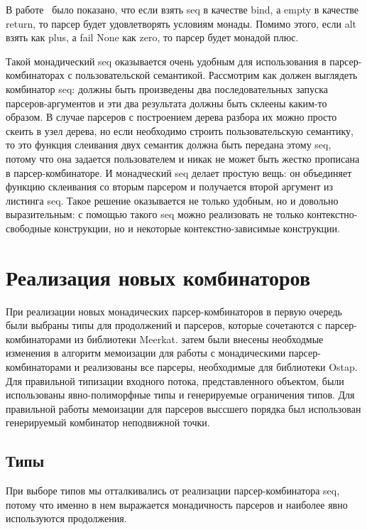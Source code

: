 \documentclass[conference]{IEEEtran}
\begin{document}
В работе~\cite{wadler} было показано, что если взять seq в качестве bind, а empty в качестве return, то парсер будет удовлетворять условиям монады. Помимо этого, если alt взять как plus, а fail None как zero, то парсер будет монадой плюс. 

Такой монадический seq оказывается очень удобным для использования в парсер-комбинаторах с пользовательской семантикой. Рассмотрим как должен выглядеть комбинатор seq: должны быть произведены два последовательных запуска парсеров-аргументов и эти два результата должны быть склеены каким-то образом. В случае парсеров с построением дерева разбора их можно просто скеить в узел дерева, но если необходимо строить пользовательскую семантику, то это функция слеивания двух семантик должна быть передана этому seq, потому что она задается пользователем и никак не может быть жестко прописана в парсер-комбинаторе. И монадческий seq делает простую вещь: он объединяет функцию склеивания со вторым парсером и получается второй аргумент из листинга seq. Такое решение оказывается не только удобным, но и довольно выразительным: с помощью такого seq можно реализовать не только контекстно-свободные конструкции, но и некоторые контекстно-зависимые конструкции.

\section{Реализация новых комбинаторов}

При реализации новых монадических парсер-комбинаторов в первую очередь были выбраны типы для продолжений и парсеров, которые сочетаются с парсер-комбинаторами из библиотеки Meerkat. затем были внесены необходмые изменения в алгоритм мемоизации для работы с монадическими парсер-комбинаторами и реализованы все парсеры, необходимые для библиотеки Ostap. Для правильной типизации входного потока, представленного объектом, были использованы явно-полиморфные типы и генерируемые ограничения типов. Для правильной работы мемоизации для парсеров выссшего порядка был использован генерируемый комбинатор неподвижной точки.

\subsection{Типы}

При выборе типов мы отталкивались от реализации парсер-комбинатора seq, потому что именно в нем выражается монадичность парсеров и наиболее явно используются продолжения.
\end{document}
